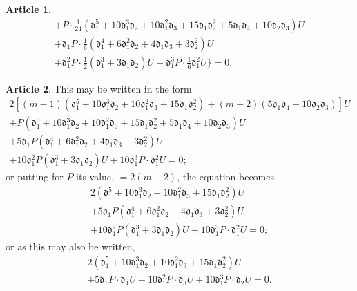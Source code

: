 \documentclass[12pt,a4paper]{article}
\theoremstyle{definition}
\newtheorem{art}{Article}[section]
\begin{document}
\begin{art}
\begin{multline*}
+ P \cdot \tfrac{1}{24}(\mathfrak{d}_1^5 + 10\mathfrak{d}_1^3\mathfrak{d}_2 + 10\mathfrak{d}_1^2\mathfrak{d}_3 + 15\mathfrak{d}_1\mathfrak{d}_2^2 + 5\mathfrak{d}_1\mathfrak{d}_4 + 10\mathfrak{d}_2\mathfrak{d}_3)U \\
+ \mathfrak{d}_1 P \cdot \tfrac{1}{6}(\mathfrak{d}_1^4 + 6\mathfrak{d}_1^2\mathfrak{d}_2 + 4\mathfrak{d}_1\mathfrak{d}_3 + 3\mathfrak{d}_2^2)U \\
+ \mathfrak{d}_1^2 P \cdot \tfrac{1}{2}(\mathfrak{d}_1^3 + 3\mathfrak{d}_1\mathfrak{d}_2)U + \mathfrak{d}_1^3 P \cdot \tfrac{1}{6}\mathfrak{d}_1^2 U\} = 0.
\end{multline*}
\end{art}

\begin{art}
This may be written in the form
\begin{multline*}
2[(m - 1)(\mathfrak{d}_1^5 + 10\mathfrak{d}_1^3\mathfrak{d}_2 + 10\mathfrak{d}_1^2\mathfrak{d}_3 + 15\mathfrak{d}_1\mathfrak{d}_2^2) + (m - 2)(5\mathfrak{d}_1\mathfrak{d}_4 + 10\mathfrak{d}_2\mathfrak{d}_3)]U \\
+ P(\mathfrak{d}_1^5 + 10\mathfrak{d}_1^3\mathfrak{d}_2 + 10\mathfrak{d}_1^2\mathfrak{d}_3 + 15\mathfrak{d}_1\mathfrak{d}_2^2 + 5\mathfrak{d}_1\mathfrak{d}_4 + 10\mathfrak{d}_2\mathfrak{d}_3)U \\
+ 5\mathfrak{d}_1 P(\mathfrak{d}_1^4 + 6\mathfrak{d}_1^2\mathfrak{d}_2 + 4\mathfrak{d}_1\mathfrak{d}_3 + 3\mathfrak{d}_2^2)U \\
+ 10\mathfrak{d}_1^2 P(\mathfrak{d}_1^3 + 3\mathfrak{d}_1\mathfrak{d}_2)U + 10\mathfrak{d}_1^3 P \cdot \mathfrak{d}_1^2 U = 0;
\end{multline*}
or putting for $P$ its value, $= 2(m - 2)$, the equation becomes
\begin{multline*}
2(\mathfrak{d}_1^5 + 10\mathfrak{d}_1^3\mathfrak{d}_2 + 10\mathfrak{d}_1^2\mathfrak{d}_3 + 15\mathfrak{d}_1\mathfrak{d}_2^2)U \\
+ 5\mathfrak{d}_1 P(\mathfrak{d}_1^4 + 6\mathfrak{d}_1^2\mathfrak{d}_2 + 4\mathfrak{d}_1\mathfrak{d}_3 + 3\mathfrak{d}_2^2)U \\
+ 10\mathfrak{d}_1^2 P(\mathfrak{d}_1^3 + 3\mathfrak{d}_1\mathfrak{d}_2)U + 10\mathfrak{d}_1^3 P \cdot \mathfrak{d}_1^2 U = 0;
\end{multline*}
or as this may also be written,
\begin{multline*}
2(\mathfrak{d}_1^5 + 10\mathfrak{d}_1^3\mathfrak{d}_2 + 10\mathfrak{d}_1^2\mathfrak{d}_3 + 15\mathfrak{d}_1\mathfrak{d}_2^2)U \\
+ 5\mathfrak{d}_1 P \cdot \mathfrak{d}_4 U + 10\mathfrak{d}_1^2 P \cdot \mathfrak{d}_3 U + 10\mathfrak{d}_1^3 P \cdot \mathfrak{d}_2 U = 0.
\end{multline*}
\end{art}
\end{document}
